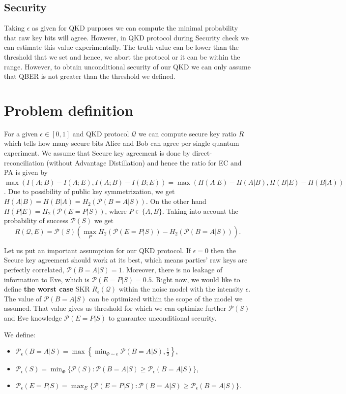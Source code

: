 \documentclass[12pt,a4paper,reqno, aps, superscriptaddress]{amsart}
\newcommand{\PP}{\ensuremath{\mathcal{P}}}
\newcommand{\QQ}{\ensuremath{\mathcal{Q}}}
\begin{document}
\subsection{Security}
Taking $\epsilon$ as given for QKD purposes we can compute the minimal 
probability that raw key bits will agree. However, in QKD protocol during 
Security check we can estimate this value experimentally. The truth value can 
be lower than the threshold that we set and hence, we abort the protocol or it 
can be within the range. However, to obtain unconditional security of our QKD 
we can only assume that QBER is not greater than the threshold we defined.

\section{Problem definition}
For a given $\epsilon \in [0,1]$ and QKD protocol $\QQ$ we can compute secure 
key 
ratio $R$ which tells how many secure bits Alice and Bob can agree per single 
quantum experiment. We assume that Secure key agreement is done by 
direct-reconciliation (without Advantage Distillation) and hence the ratio for 
EC and PA is given by $\max(I(A;B) - I(A;E),I(A;B) -I(B;E)) = 
\max(H(A|E)-H(A|B),H(B|E)-H(B|A))$. Due to possibility of public key 
symmetrization, we get $H(A|B)=H(B|A)=H_2(\PP(B=A|S))$. On the other hand 
$H(P|E)=H_2(\PP(E=P|S))$, where $P \in \{A,B\}$. Taking into 
account the probability of success $\PP(S)$ we get
\begin{equation}
R(\QQ, E) = \PP(S)(\max_P H_2(\PP(E=P|S)) - H_2(\PP(B=A|S))).
\end{equation}

Let us put an important assumption for our QKD protocol. If $\epsilon=0$ 
then the Secure key agreement should work at its best, which means parties' 
raw keys are perfectly correlated, $\PP(B=A|S)=1$. Moreover, there is no 
leakage of information to Eve, which is $\PP(E=P|S)=0.5$. Right now, we 
would like to define \textbf{the worst case} SKR $R_\epsilon(\QQ)$ 
within the 
noise model with the intensity $\epsilon$. The value of $\PP(B=A|S)$ 
can be optimized within the scope of the model we assumed. That value gives us 
threshold for which we can optimize further $\PP(S)$ and Eve knowledge 
$\PP(E=P|S)$ to guarantee unconditional security.

We define:
\begin{itemize}
\item $\PP_\epsilon(B=A|S) = \max\left\{\min_{\Phi \sim \epsilon} 
\PP(B=A|S), \frac12 \right\}$,
\item $\PP_\epsilon(S) = \min_{\Phi}\{ \PP(S): \PP(B=A|S) \ge 
\PP_\epsilon(B=A|S) \}$,
\item $\PP_\epsilon(E=P|S) = \max_{E} \{\PP(E=P|S): \PP(B=A|S) \ge 
\PP_\epsilon(B=A|S)\}$.
\end{itemize}
\end{document}
